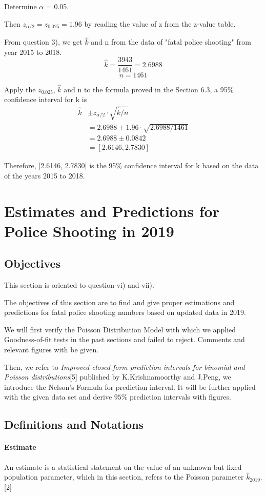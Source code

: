 \documentclass[a4paper]{article}
\begin{document}
Determine $\alpha$ = 0.05.

Then $z_{\alpha/2} = z_{0.025} = 1.96$ by reading the value of z from the z-value table.

From question 3), we get $\hat{k}$ and n from the data of "fatal police shooting" from year 2015 to 2018.
$$\hat{k} = \frac{3943}{1461} = 2.6988$$
$$n = 1461$$

Apply the $z_{0.025}$, $\hat{k}$ and n to the formula proved in the Section 6.3, a 95\% confidence interval for k is
\begin{align*}
    \hat{k}&\pm z_{\alpha/2}\cdot\sqrt{\hat{k}/n}\\
    &= 2.6988\pm1.96\cdot\sqrt{2.6988/1461}\\
    &= 2.6988\pm0.0842\\
    &= [2.6146, 2.7830]
\end{align*}

Therefore, [2.6146, 2.7830] is the 95\% confidence interval for k based on the data of the years 2015 to 2018.

\newpage

\section{Estimates and Predictions for Police Shooting in 2019}
\subsection{Objectives}
This section is oriented to question vi) and vii). 

The objectives of this section are to find and give proper estimations and predictions for fatal police shooting numbers based on updated data in 2019.

We will first verify the Poisson Distribution Model with which we applied Goodness-of-fit tests in the past sections and failed to reject. Comments and relevant figures with be given.

Then, we refer to \textit{Improved closed-form prediction intervals for binomial and Poisson distributions}[5] published by K.Krishnamoorthy and J.Peng, we introduce the Nelson's Formula for prediction interval. It will be further applied with the given data set and derive $95\%$ prediction intervals with figures.
\subsection{Definitions and Notations}
\paragraph{Estimate} An estimate is a statistical statement on the value of an unknown but fixed population parameter, which in this section, refers to the Poisson parameter $\widehat{k}_{2019}$. [2]
\end{document}
